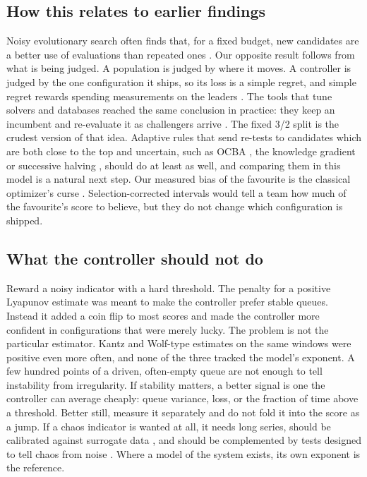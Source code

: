 \documentclass[11pt,a4paper]{article}
\begin{document}
\subsection{How this relates to earlier findings}
Noisy evolutionary search often finds that, for a fixed budget, new candidates are a better use of evaluations than repeated ones \citep{fitzpatrick1988genetic,beyer2000evolutionary}. Our opposite result follows from what is being judged. A population is judged by where it moves. A controller is judged by the one configuration it ships, so its loss is a simple regret, and simple regret rewards spending measurements on the leaders \citep{bubeck2011pure}. The tools that tune solvers and databases reached the same conclusion in practice: they keep an incumbent and re-evaluate it as challengers arrive \citep{hutter2009paramils,hutter2011sequential,lopezibanez2016irace}. The fixed 3/2 split is the crudest version of that idea. Adaptive rules that send re-tests to candidates which are both close to the top and uncertain, such as OCBA \citep{chen2000simulation}, the knowledge gradient \citep{frazier2008knowledge} or successive halving \citep{li2018hyperband}, should do at least as well, and comparing them in this model is a natural next step. Our measured bias of the favourite is the classical optimizer's curse \citep{smithwinkler2006}. Selection-corrected intervals \citep{andrews2024inference} would tell a team how much of the favourite's score to believe, but they do not change which configuration is shipped.

\subsection{What the controller should not do}
Reward a noisy indicator with a hard threshold. The penalty for a positive Lyapunov estimate was meant to make the controller prefer stable queues. Instead it added a coin flip to most scores and made the controller more confident in configurations that were merely lucky. The problem is not the particular estimator. Kantz and Wolf-type estimates on the same windows were positive even more often, and none of the three tracked the model's exponent. A few hundred points of a driven, often-empty queue are not enough to tell instability from irregularity. If stability matters, a better signal is one the controller can average cheaply: queue variance, loss, or the fraction of time above a threshold. Better still, measure it separately and do not fold it into the score as a jump. If a chaos indicator is wanted at all, it needs long series, should be calibrated against surrogate data \citep{theiler1992testing}, and should be complemented by tests designed to tell chaos from noise \citep{gottwald2004new,rosso2007distinguishing}. Where a model of the system exists, its own exponent is the reference.
\end{document}
